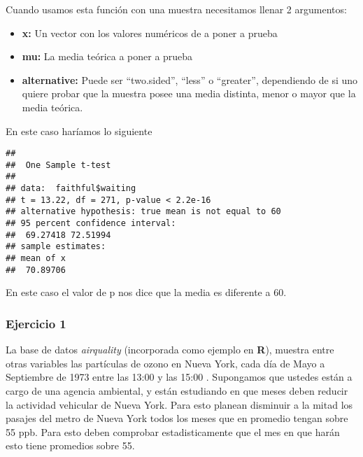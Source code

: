 \documentclass[]{book}
\newenvironment{Shaded}{\begin{snugshade}}{\end{snugshade}}
\newcommand{\KeywordTok}[1]{\textcolor[rgb]{0.13,0.29,0.53}{\textbf{#1}}}
\newcommand{\DataTypeTok}[1]{\textcolor[rgb]{0.13,0.29,0.53}{#1}}
\newcommand{\DecValTok}[1]{\textcolor[rgb]{0.00,0.00,0.81}{#1}}
\newcommand{\StringTok}[1]{\textcolor[rgb]{0.31,0.60,0.02}{#1}}
\newcommand{\OperatorTok}[1]{\textcolor[rgb]{0.81,0.36,0.00}{\textbf{#1}}}
\newcommand{\NormalTok}[1]{#1}
\providecommand{\tightlist}{%
  \setlength{\itemsep}{0pt}\setlength{\parskip}{0pt}}
\begin{document}
Cuando usamos esta función con una muestra necesitamos llenar 2
argumentos:

\begin{itemize}
\tightlist
\item
  \textbf{x:} Un vector con los valores numéricos de a poner a prueba
\item
  \textbf{mu:} La media teórica a poner a prueba
\item
  \textbf{alternative:} Puede ser ``two.sided'', ``less'' o ``greater'',
  dependiendo de si uno quiere probar que la muestra posee una media
  distinta, menor o mayor que la media teórica.
\end{itemize}

En este caso haríamos lo siguiente

\begin{Shaded}
\end{Shaded}

\begin{verbatim}
## 
##  One Sample t-test
## 
## data:  faithful$waiting
## t = 13.22, df = 271, p-value < 2.2e-16
## alternative hypothesis: true mean is not equal to 60
## 95 percent confidence interval:
##  69.27418 72.51994
## sample estimates:
## mean of x 
##  70.89706
\end{verbatim}

En este caso el valor de p nos dice que la media es diferente a 60.

\subsubsection{Ejercicio 1}\label{ejercicio-1}

La base de datos \emph{airquality} (incorporada como ejemplo en
\textbf{R}), muestra entre otras variables las partículas de ozono en
Nueva York, cada día de Mayo a Septiembre de 1973 entre las 13:00 y las
15:00 \citep{chambers35graphical}. Supongamos que ustedes están a cargo
de una agencia ambiental, y están estudiando en que meses deben reducir
la actividad vehicular de Nueva York. Para esto planean disminuir a la
mitad los pasajes del metro de Nueva York todos los meses que en
promedio tengan sobre 55 ppb. Para esto deben comprobar estadisticamente
que el mes en que harán esto tiene promedios sobre 55.
\end{document}
